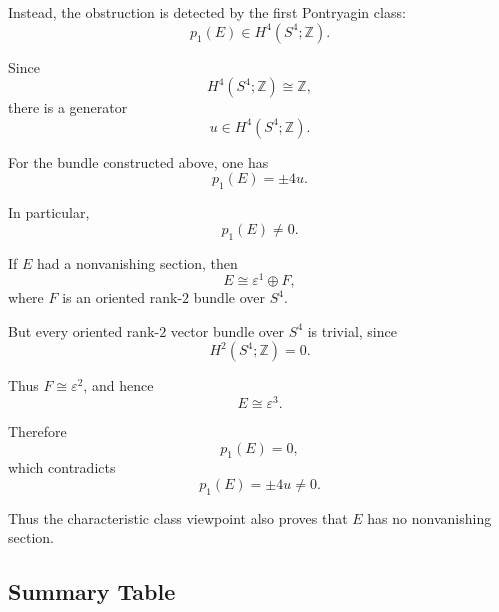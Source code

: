 \documentclass[12pt,a4paper]{article}
\theoremstyle{notespace}
\begin{document}
Instead, the obstruction is detected by the first Pontryagin class:
\[
p_1(E)\in H^4(S^4;\mathbb Z).
\]

Since
\[
H^4(S^4;\mathbb Z)\cong \mathbb Z,
\]
there is a generator
\[
u\in H^4(S^4;\mathbb Z).
\]

For the bundle constructed above, one has
\[
p_1(E)=\pm 4u.
\]

In particular,
\[
p_1(E)\neq 0.
\]

If \(E\) had a nonvanishing section, then
\[
E\cong \varepsilon^1\oplus F,
\]
where \(F\) is an oriented rank-\(2\) bundle over \(S^4\).

But every oriented rank-\(2\) vector bundle over \(S^4\) is trivial, since
\[
H^2(S^4;\mathbb Z)=0.
\]

Thus \(F\cong \varepsilon^2\), and hence
\[
E\cong \varepsilon^3.
\]

Therefore
\[
p_1(E)=0,
\]
which contradicts
\[
p_1(E)=\pm 4u\neq 0.
\]

Thus the characteristic class viewpoint also proves that \(E\) has no nonvanishing section.

\subsection{Summary Table}
\end{document}
